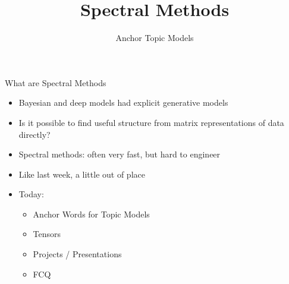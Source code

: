 \documentclass[compress]{beamer}
\title{Spectral Methods}
\date{Anchor Topic Models}
\begin{document}

\begin{frame}{What are Spectral Methods}

\begin{itemize}
  \item Bayesian and deep models had explicit generative models
  \item Is it possible to find useful structure from matrix
    representations of data directly?
  \item Spectral methods: often very fast, but hard to engineer
  \item Like last week, a little out of place
  \item Today:
    \begin{itemize}
      \item Anchor Words for Topic Models
      \item Tensors
        \pause
        \item Projects / Presentations
        \item FCQ
    \end{itemize}
\end{itemize}

\end{frame}
\end{document}
